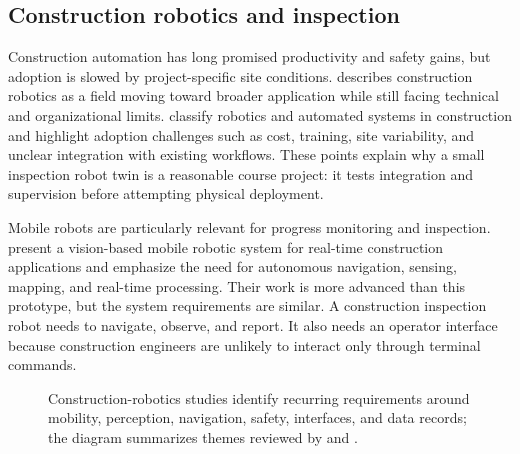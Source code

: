 \documentclass[12pt,a4paper]{article}
\begin{document}
\subsection{Construction robotics and inspection}

Construction automation has long promised productivity and safety gains, but adoption is slowed by project-specific site conditions. \citet{bock2015future} describes construction robotics as a field moving toward broader application while still facing technical and organizational limits. \citet{delgado2019robotics} classify robotics and automated systems in construction and highlight adoption challenges such as cost, training, site variability, and unclear integration with existing workflows. These points explain why a small inspection robot twin is a reasonable course project: it tests integration and supervision before attempting physical deployment.

Mobile robots are particularly relevant for progress monitoring and inspection. \citet{asadi2018vision} present a vision-based mobile robotic system for real-time construction applications and emphasize the need for autonomous navigation, sensing, mapping, and real-time processing. Their work is more advanced than this prototype, but the system requirements are similar. A construction inspection robot needs to navigate, observe, and report. It also needs an operator interface because construction engineers are unlikely to interact only through terminal commands.

\begin{figure}[htbp]
  \centering
  \caption{Construction-robotics studies identify recurring requirements around mobility, perception, navigation, safety, interfaces, and data records; the diagram summarizes themes reviewed by \citet{delgado2019robotics} and \citet{asadi2018vision}.}
  \label{fig:robotics-literature}
\end{figure}
\end{document}
